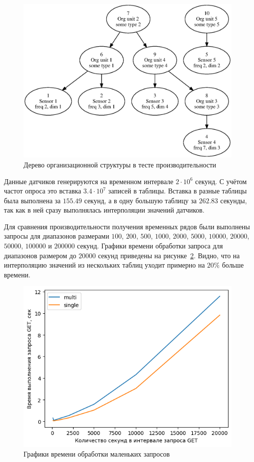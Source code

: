\begin{figure}
    \includegraphics[scale=0.6]{../img/bench.eps}
    \caption{Дерево организационной структуры в тесте производительности}
    \label{bench-graph}
\end{figure}

Данные датчиков генерируются на временном интервале $2 \cdot {10} ^ {6}$ секунд. С учётом частот опроса это вставка $3.4 \cdot {10} ^ {7}$ записей в таблицы. Вставка в разные таблицы была выполнена за $155.49$ секунд, а в одну большую таблицу за $262.83$ секунды, так как в ней сразу выполнялась интерполяции значений датчиков.

Для сравнения производительности получения временных рядов были выполнены запросы для диапазонов размерами $100$, $200$, $500$, $1000$, $2000$, $5000$, $10000$, $20000$, $50000$, $100000$ и $200000$ секунд. Графики времени обработки запроса для диапазонов размером до $20000$ секунд приведены на рисунке~\ref{bench2e4}. Видно, что на интерполяцию значений из нескольких таблиц уходит примерно на $20\%$ больше времени.

\begin{figure}
    \includegraphics[scale=1.0]{../img/bench2e4.png}
    \caption{Графики времени обработки маленьких запросов}
    \label{bench2e4}
\end{figure}

